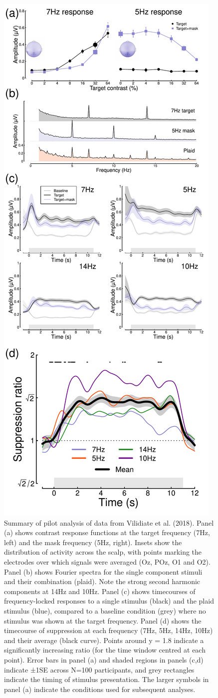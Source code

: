 \documentclass[
]{article}
\begin{document}
\begin{figure}

{\centering \includegraphics[width=0.4\linewidth]{Figures/VilidaiteData} 

}

\caption{Summary of pilot analysis of data from Vilidiate et al. (2018). Panel (a) shows contrast response functions at the target frequency (7Hz, left) and the mask frequency (5Hz, right). Insets show the distribution of activity across the scalp, with points marking the electrodes over which signals were averaged (Oz, POz, O1 and O2). Panel (b) shows Fourier spectra for the single component stimuli and their combination (plaid). Note the strong second harmonic components at 14Hz and 10Hz. Panel (c) shows timecourses of frequency-locked responses to a single stimulus (black) and the plaid stimulus (blue), compared to a baseline condition (grey) where no stimulus was shown at the target frequency. Panel (d) shows the timecourse of suppression at each frequency (7Hz, 5Hz, 14Hz, 10Hz) and their average (black curve). Points around y = 1.8 indicate a significantly increasing ratio (for the time window centred at each point). Error bars in panel (a) and shaded regions in panels (c,d) indicate ±1SE across N=100 participants, and grey rectangles indicate the timing of stimulus presentation. The larger symbols in panel (a) indicate the conditions used for subsequent analyses.}\label{fig:Pilotdata}
\end{figure}
\end{document}
